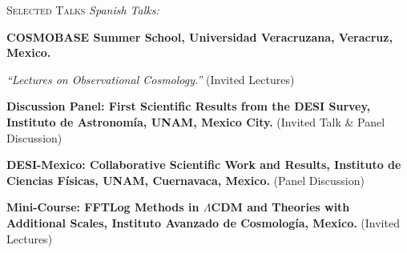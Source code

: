 \begin{rubric}{\faMicrophone \textsc{Selected Talks}}
\vspace{0.5cm}
\textit{Spanish Talks:}
\vspace*{0.5cm}

\entry*[]%
\textbf{COSMOBASE Summer School, Universidad Veracruzana, Veracruz, Mexico.} \par
\emph{“Lectures on Observational Cosmology.”} (Invited Lectures)

\entry*[]%
\textbf{Discussion Panel: First Scientific Results from the DESI Survey, Instituto de Astronomía, UNAM, Mexico City.} (Invited Talk \& Panel Discussion)

\entry*[]%
\textbf{DESI-Mexico: Collaborative Scientific Work and Results, Instituto de Ciencias Físicas, UNAM, Cuernavaca, Mexico.} (Panel Discussion)

\entry*[]%
\textbf{Mini-Course: FFTLog Methods in $\Lambda$CDM and Theories with Additional Scales, Instituto Avanzado de Cosmología, Mexico.} (Invited Lectures)



\end{rubric}


